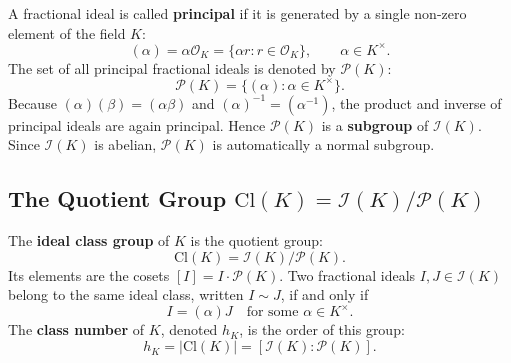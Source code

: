 \documentclass[a4paper]{article}
\begin{document}
\begin{definition}
A fractional ideal is called \textbf{principal} if it is generated by a single non-zero element of the field $K$:
\begin{equation}
 (\alpha) = \alpha \mathcal{O}_K = \{ \alpha r : r \in \mathcal{O}_K \}, \qquad \alpha \in K^\times.
\end{equation}
The set of all principal fractional ideals is denoted by $\mathcal{P}(K)$:
\begin{equation}
 \mathcal{P}(K) = \{ (\alpha) : \alpha \in K^\times \}.
\end{equation}
Because $(\alpha)(\beta) = (\alpha\beta)$ and $(\alpha)^{-1} = (\alpha^{-1})$, the product and inverse of principal ideals are again principal. Hence $\mathcal{P}(K)$ is a \textbf{subgroup} of $\mathcal{I}(K)$. Since $\mathcal{I}(K)$ is abelian, $\mathcal{P}(K)$ is automatically a normal subgroup.
\end{definition}

\subsection{The Quotient Group \texorpdfstring{$\mathrm{Cl}(K) = \mathcal{I}(K) / \mathcal{P}(K)$}{Cl(K) = I(K) / P(K)}}
\begin{definition}
The \textbf{ideal class group} of $K$ is the quotient group:
\begin{equation}
 \mathrm{Cl}(K) = \mathcal{I}(K) / \mathcal{P}(K).
 \label{eq:class_group_quotient}
\end{equation}
Its elements are the cosets $[I] = I \cdot \mathcal{P}(K)$. Two fractional ideals $I, J \in \mathcal{I}(K)$ belong to the same ideal class, written $I \sim J$, if and only if
\begin{equation}
 I = (\alpha) J \quad \text{for some } \alpha \in K^\times.
\end{equation}
The \textbf{class number} of $K$, denoted $h_K$, is the order of this group:
\begin{equation}
 h_K = |\mathrm{Cl}(K)| = [\mathcal{I}(K) : \mathcal{P}(K)].
\end{equation}
\end{definition}
\end{document}
